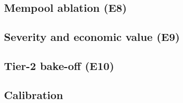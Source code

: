\subsection{Mempool ablation (E8)}\label{sec:res-mempool}

\subsection{Severity and economic value (E9)}\label{sec:res-economics}

\subsection{Tier-2 bake-off (E10)}\label{sec:res-tier2}

\subsection{Calibration}\label{sec:res-calibration}
